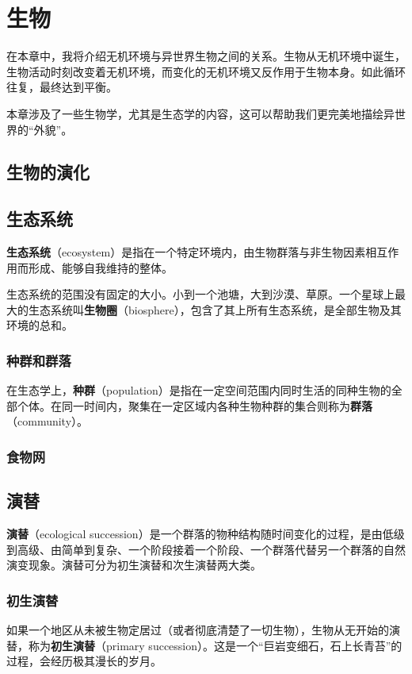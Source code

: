 \chapter{生物}
在本章中，我将介绍无机环境与异世界生物之间的关系。生物从无机环境中诞生，生物活动时刻改变着无机环境，而变化的无机环境又反作用于生物本身。如此循环往复，最终达到平衡。

本章涉及了一些生物学，尤其是生态学的内容，这可以帮助我们更完美地描绘异世界的“外貌”。

\section{生物的演化}

\section{生态系统}
\textbf{生态系统}（ecosystem）是指在一个特定环境内，由生物群落与非生物因素相互作用而形成、能够自我维持的整体。

生态系统的范围没有固定的大小。小到一个池塘，大到沙漠、草原。一个星球上最大的生态系统叫\textbf{生物圈}（biosphere），包含了其上所有生态系统，是全部生物及其环境的总和。

\subsection{种群和群落}
在生态学上，\textbf{种群}（population）是指在一定空间范围内同时生活的同种生物的全部个体。在同一时间内，聚集在一定区域内各种生物种群的集合则称为\textbf{群落}（community）。

\subsection{食物网}

\section{演替}
\textbf{演替}（ecological succession）是一个群落的物种结构随时间变化的过程，是由低级到高级、由简单到复杂、一个阶段接着一个阶段、一个群落代替另一个群落的自然演变现象。演替可分为初生演替和次生演替两大类。

\subsection{初生演替}
如果一个地区从未被生物定居过（或者彻底清楚了一切生物），生物从无开始的演替，称为\textbf{初生演替}（primary succession）。这是一个“巨岩变细石，石上长青苔”的过程，会经历极其漫长的岁月。

